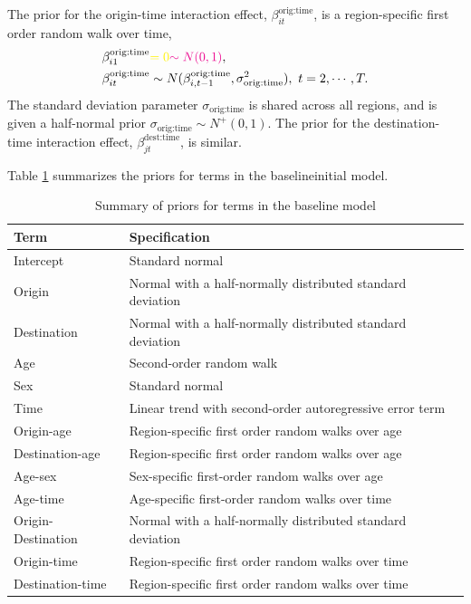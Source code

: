 \documentclass{article}
\begin{document}
The prior for the origin-time interaction effect, $\beta_{it}^{\text{orig:time}}$, is a region-specific first order random walk over time,
\begin{equation}
\begin{aligned}
\beta_{i1}^{\text{orig:time}}&{\color{yellow}=0}{\color{magenta}\sim N(0,1)},\\
\beta_{it}^{\text{orig:time}}&\sim N(\beta_{i,t-1}^{\text{orig:time}},\sigma_{\text{orig:time}}^2),\ t=2,\cdots,T.
\end{aligned}
\end{equation}
The standard deviation parameter $\sigma_{\text{orig:time}}$ is shared across all regions, and is given a half-normal prior $\sigma_{\text{orig:time}}\sim N^+(0,1)$. The prior for the destination-time interaction effect, $\beta_{jt}^{\text{dest:time}}$, is similar.

Table \ref{tab:prior-summary} summarizes the priors for terms in the {\color{yellow}baseline}{\color{magenta}initial} model.
\begin{table}[ht]
\centering
\caption{Summary of priors for terms in the baseline model}
\label{tab:prior-summary} 
\begin{tabular}{l p{9cm}}
  \hline
Term & Specification \\ 
  \hline
Intercept & Standard normal\\
Origin & Normal with a half-normally distributed standard deviation\\
Destination & Normal with a half-normally distributed standard deviation\\
Age & Second-order random walk\\
Sex & Standard normal\\
Time & Linear trend with second-order autoregressive error term \\
Origin-age & Region-specific first order random walks over age\\
Destination-age & Region-specific first order random walks over age\\
  Age-sex & Sex-specific first-order random walks over age\\
  Age-time & Age-specific first-order random walks over time \\
  Origin-Destination & Normal with a half-normally distributed standard deviation\\
  Origin-time & Region-specific first order random walks over time\\
  Destination-time & Region-specific first order random walks over time\\
  \hline
\end{tabular}
\end{table}
\end{document}
